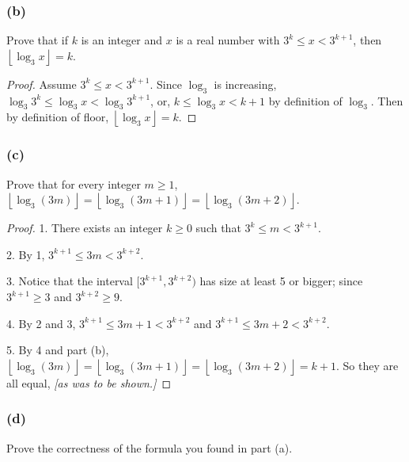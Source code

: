 \documentclass[14pt]{extarticle}
\newcommand{\floor}[1]{{\left\lfloor#1\right\rfloor}}
\begin{document}
\subsubsection{(b)}
Prove that if \(k\) is an integer and \(x\) is a real number with \(3^k \leq x < 3^{k+1}\), then \(\floor{\log_3 x} = k\).

\begin{proof}
    Assume \(3^k \leq x < 3^{k+1}\). Since \(\log_3\) is increasing, \(\log_3 3^k \leq \log_3 x < \log_3 3^{k+1}\), or,
    \(k \leq \log_3 x < k+1\) by definition of \(\log_3\). Then by definition of floor, \(\floor{\log_3 x} = k\).
\end{proof}

\subsubsection{(c)}
Prove that for every integer \(m \geq1\), \(\floor{\log_3(3m)} = \floor{\log_3(3m + 1)} = \floor{\log_3(3m + 2)}\).

\begin{proof}
    1. There exists an integer \(k \geq 0\) such that \(3^k \leq m < 3^{k+1}\).

    2. By 1, \(3^{k+1} \leq 3m < 3^{k+2}\).

    3. Notice that the interval \([3^{k+1}, 3^{k+2})\) has size at least 5 or bigger; since \(3^{k+1} \geq 3\) and
    \(3^{k+2} \geq 9\).

    4. By 2 and 3, \(3^{k+1} \leq 3m + 1 < 3^{k+2}\) and \(3^{k+1} \leq 3m + 2 < 3^{k+2}\).

    5. By 4 and part (b), \(\floor{\log_3(3m)} = \floor{\log_3(3m + 1)} = \floor{\log_3(3m + 2)} = k+1\).
    So they are all equal, {\it [as was to be shown.]}
\end{proof}

\subsubsection{(d)}
Prove the correctness of the formula you found in part (a).
\end{document}
